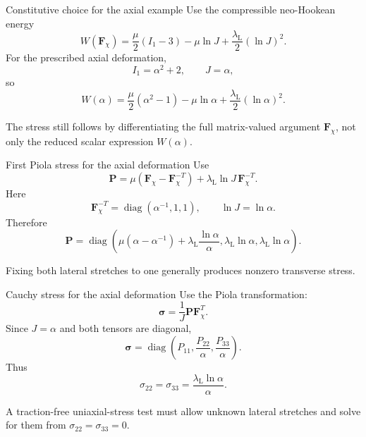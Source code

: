 \documentclass[aspectratio=169,11pt]{beamer}
\newcommand{\Fdef}{\bm{F}_{\chi}}
\newcommand{\sigmaC}{\bm{\sigma}}
\newcommand{\Pten}{\bm{P}}
\begin{document}
\begin{frame}{Constitutive choice for the axial example}
Use the compressible neo-Hookean energy
\[
  W(\Fdef)
  =
  \frac{\mu}{2}(I_1-3)
  -\mu\ln J
  +\frac{\lambda_{\mathrm L}}{2}(\ln J)^2.
\]
For the prescribed axial deformation,
\[
  I_1=\alpha^2+2,
  \qquad
  J=\alpha,
\]
so
\[
  W(\alpha)
  =
  \frac{\mu}{2}(\alpha^2-1)
  -\mu\ln\alpha
  +\frac{\lambda_{\mathrm L}}{2}(\ln\alpha)^2.
\]
\begin{punchbox}
\small
The stress still follows by differentiating the full matrix-valued argument \(\Fdef\), not only the reduced scalar expression \(W(\alpha)\).
\end{punchbox}
\end{frame}

\begin{frame}{First Piola stress for the axial deformation}
Use
\[
  \Pten
  =
  \mu(\Fdef-\Fdef^{-T})
  +\lambda_{\mathrm L}\ln J\,\Fdef^{-T}.
\]
Here
\[
  \Fdef^{-T}
  =
  \operatorname{diag}(\alpha^{-1},1,1),
  \qquad
  \ln J=\ln\alpha.
\]
Therefore
\[
  \boxed{
  \Pten
  =
  \operatorname{diag}\left(
  \mu(\alpha-\alpha^{-1})
  +\lambda_{\mathrm L}\frac{\ln\alpha}{\alpha},
  \lambda_{\mathrm L}\ln\alpha,
  \lambda_{\mathrm L}\ln\alpha
  \right)
  }.
\]
\begin{punchbox}
\small
Fixing both lateral stretches to one generally produces nonzero transverse stress.
\end{punchbox}
\end{frame}

\begin{frame}{Cauchy stress for the axial deformation}
Use the Piola transformation:
\[
  \sigmaC
  =
  \frac{1}{J}\Pten\Fdef^T.
\]
Since \(J=\alpha\) and both tensors are diagonal,
\[
  \sigmaC
  =
  \operatorname{diag}\left(
    P_{11},
    \frac{P_{22}}{\alpha},
    \frac{P_{33}}{\alpha}
  \right).
\]
Thus
\[
  \sigma_{22}=\sigma_{33}
  =
  \frac{\lambda_{\mathrm L}\ln\alpha}{\alpha}.
\]
\begin{punchbox}
\small
A traction-free uniaxial-stress test must allow unknown lateral stretches and solve for them from \(\sigma_{22}=\sigma_{33}=0\).
\end{punchbox}
\end{frame}
\end{document}
